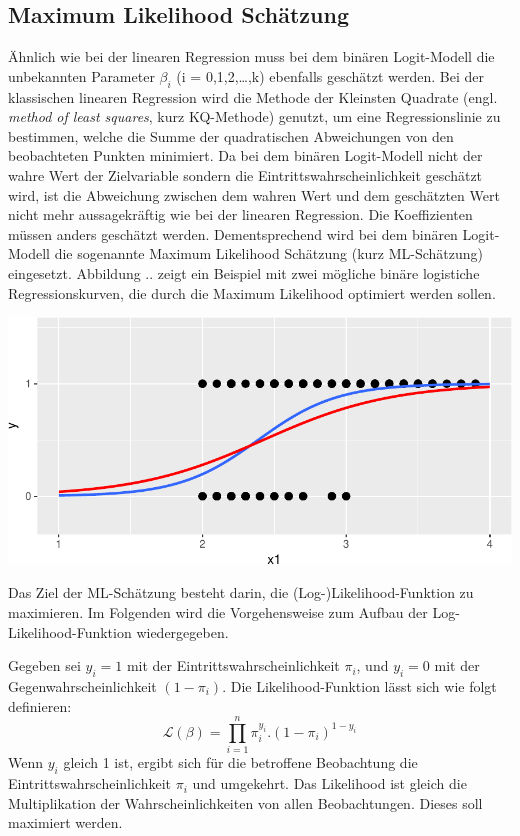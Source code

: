 \documentclass[12pt,]{article}
\begin{document}
\subsection{Maximum Likelihood
Schätzung}\label{maximum-likelihood-schatzung}

Ähnlich wie bei der linearen Regression muss bei dem binären
Logit-Modell die unbekannten Parameter \(\beta_i\) (i =
0,1,2,\ldots{},k) ebenfalls geschätzt werden. Bei der klassischen
linearen Regression wird die Methode der Kleinsten Quadrate (engl.
\emph{method of least squares}, kurz KQ-Methode) genutzt, um eine
Regressionslinie zu bestimmen, welche die Summe der quadratischen
Abweichungen von den beobachteten Punkten minimiert. Da bei dem binären
Logit-Modell nicht der wahre Wert der Zielvariable sondern die
Eintrittswahrscheinlichkeit geschätzt wird, ist die Abweichung zwischen
dem wahren Wert und dem geschätzten Wert nicht mehr aussagekräftig wie
bei der linearen Regression. Die Koeffizienten müssen anders geschätzt
werden. Dementsprechend wird bei dem binären Logit-Modell die sogenannte
Maximum Likelihood Schätzung (kurz ML-Schätzung) eingesetzt. Abbildung
.. zeigt ein Beispiel mit zwei mögliche binäre logistiche
Regressionskurven, die durch die Maximum Likelihood optimiert werden
sollen.

\includegraphics{logisticRegression_files/figure-latex/unnamed-chunk-2-1.pdf}

Das Ziel der ML-Schätzung besteht darin, die (Log-)Likelihood-Funktion
zu maximieren. Im Folgenden wird die Vorgehensweise zum Aufbau der
Log-Likelihood-Funktion wiedergegeben.

Gegeben sei \(y_i = 1\) mit der Eintrittswahrscheinlichkeit \(\pi_i\),
und \(y_i = 0\) mit der Gegenwahrscheinlichkeit \((1-\pi_i)\). Die
Likelihood-Funktion lässt sich wie folgt definieren: \[
\mathcal{L}(\beta) = {\prod_{i=1}^{n} \pi_i^{y_i}.(1-\pi_i)^{1-y_i}}
\] Wenn \(y_i\) gleich 1 ist, ergibt sich für die betroffene Beobachtung
die Eintrittswahrscheinlichkeit \(\pi_i\) und umgekehrt. Das Likelihood
ist gleich die Multiplikation der Wahrscheinlichkeiten von allen
Beobachtungen. Dieses soll maximiert werden.
\end{document}
